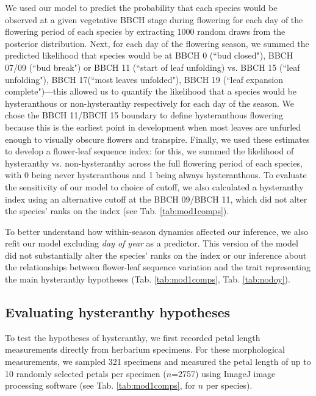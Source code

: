 \documentclass{article}[12pt]
\begin{document}
We used our model to predict the probability that each species would be observed at a given vegetative BBCH stage during flowering for each day of the flowering period of each species by extracting 1000 random draws from the posterior distribution. Next, for each day of the flowering season, we summed the predicted likelihood that species would be at BBCH 0  (``bud closed"), BBCH 07/09 (``bud break") or BBCH 11 (``start of leaf unfolding) vs. BBCH 15 (``leaf unfolding"), BBCH 17(``most leaves unfolded"), BBCH 19 (``leaf expansion complete")---this allowed us to quantify the likelihood that a species would be hysteranthous or non-hysteranthy respectively for each day of the season. We chose the BBCH 11/BBCH 15 boundary to define hysteranthous flowering because this is the earliest point in development when most leaves are unfurled enough to visually obscure flowers and transpire. Finally, we used these estimates to develop a flower-leaf sequence index: for this, we summed the likelihood of hysteranthy vs. non-hysteranthy across the full flowering period of each species, with 0 being never hysteranthous and 1 being always hysteranthous. To evaluate the sensitivity of our model to choice of cutoff, we also calculated a hysteranthy index using an alternative cutoff at the BBCH 09/BBCH 11, which did not alter the species' ranks on the index (see Tab. \ref{tab:mod1comps}).

To better understand how within-season dynamics affected our inference, we also refit our model excluding \emph{day of year} as a predictor. This version of the model did not substantially alter the species' ranks on the index or our inference about the relationships between flower-leaf sequence variation and the trait representing the main hysteranthy hypotheses (Tab. \ref{tab:mod1comps}, Tab. \ref{tab:nodoy}). 

\subsection*{Evaluating hysteranthy hypotheses}
To test the hypotheses of hysteranthy, we first recorded petal length measurements directly from herbarium specimens. For these morphological measurements, we sampled 321 specimens and measured the petal length of up to 10 randomly selected petals per specimen ($n$=2757) using ImageJ image processing software (see Tab. \ref{tab:mod1comps}, for $n$ per species).%
\end{document}
